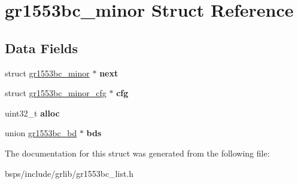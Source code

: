 \hypertarget{structgr1553bc__minor}{}\section{gr1553bc\+\_\+minor Struct Reference}
\label{structgr1553bc__minor}
\subsection*{Data Fields}
\begin{DoxyCompactItemize}
\item 
\mbox{\label{structgr1553bc__minor_a4ab47bb5a17bbcbaed7fd3a7bbfc851f}} 
struct \mbox{\hyperlink{structgr1553bc__minor}{gr1553bc\+\_\+minor}} $\ast$ {\bfseries next}
\item 
\mbox{\label{structgr1553bc__minor_a0461a2fa23f84119f13db0948bf3adff}} 
struct \mbox{\hyperlink{structgr1553bc__minor__cfg}{gr1553bc\+\_\+minor\+\_\+cfg}} $\ast$ {\bfseries cfg}
\item 
\mbox{\label{structgr1553bc__minor_affcfd8be502d0dc6f188a7065587b2f2}} 
uint32\+\_\+t {\bfseries alloc}
\item 
\mbox{\label{structgr1553bc__minor_a1a5bfa924128708938bfa881b15a2b5d}} 
union \mbox{\hyperlink{uniongr1553bc__bd}{gr1553bc\+\_\+bd}} $\ast$ {\bfseries bds}
\end{DoxyCompactItemize}


The documentation for this struct was generated from the following file\+:\begin{DoxyCompactItemize}
\item 
bsps/include/grlib/gr1553bc\+\_\+list.\+h\end{DoxyCompactItemize}
